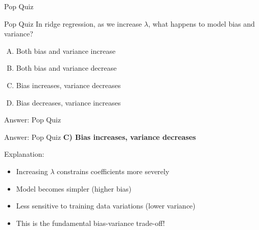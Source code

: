 \documentclass{beamer}
\begin{document}
\begin{frame}{Pop Quiz \thepopquiz}
\begin{popquizbox}{Pop Quiz \thepopquiz}
In ridge regression, as we increase $\lambda$, what happens to model bias and variance?
\begin{enumerate}[A)]
\item Both bias and variance increase
\item Both bias and variance decrease
\item Bias increases, variance decreases
\item Bias decreases, variance increases
\end{enumerate}
\end{popquizbox}
\end{frame}

\begin{frame}{Answer: Pop Quiz \thepopquiz}
\begin{popquizbox}{Answer: Pop Quiz \thepopquiz}
\textbf{C) Bias increases, variance decreases}

\vspace{0.3cm}
Explanation:
\begin{itemize}
\item Increasing $\lambda$ constrains coefficients more severely
\item Model becomes simpler (higher bias)
\item Less sensitive to training data variations (lower variance)
\item This is the fundamental bias-variance trade-off!
\end{itemize}
\end{popquizbox}
\end{frame}
\end{document}

